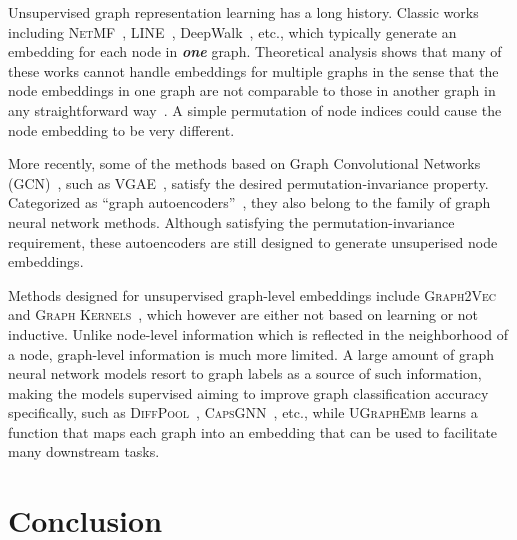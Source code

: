 \documentclass{article}
\newcommand{\model}{\textsc{UGraphEmb}\xspace}
\newcommand{\netmf}{\textsc{NetMF}\xspace}
\newcommand{\gk}{\textsc{Graph Kernels}\xspace}
\newcommand{\gv}{\textsc{Graph2Vec}\xspace}
\newcommand{\gcn}{\textsc{GCN}\xspace}
\begin{document}
Unsupervised graph representation learning has a long history. Classic works including \netmf~\cite{qiu2017network}, LINE~\cite{tang2015line}, DeepWalk~\cite{perozzi2014deepwalk}, etc., which typically generate an embedding for each node in \textbf{\textit{one}} graph. Theoretical analysis shows that many of these works cannot handle embeddings for multiple graphs in the sense that the node embeddings in one graph are not comparable to those in another graph in any straightforward way~\cite{heimann2017generalizing}. A simple permutation of node indices could cause the node embedding to be very different.

More recently, some of the methods based on Graph Convolutional Networks (\gcn)~\cite{defferrard2016convolutional,kipf2016semi}, such as \textsc{VGAE}~\cite{kipf2016variational}, satisfy the desired permutation-invariance property.
Categorized as ``graph autoencoders''~\cite{wu2019comprehensive}, they also belong to the family of graph neural network methods. Although satisfying the permutation-invariance requirement, these autoencoders are still designed to generate unsuperised node embeddings.

Methods designed for unsupervised graph-level embeddings include \gv~\cite{narayanan2017graph2vec}
and \gk~\cite{yanardag2015deep}, which however are either not based on learning or not inductive. 
Unlike node-level information which is reflected in the neighborhood of a node,
graph-level information is much more limited. A large amount of graph neural network models resort to graph labels as a source of such information, 
making the models supervised aiming to improve graph classification accuracy specifically, such as \textsc{DiffPool}~\cite{ying2018hierarchical}, \textsc{CapsGNN}~\cite{zhang2018capsule}, etc.,
while \model learns a function that maps each graph into an embedding that can be used to facilitate many downstream tasks.






















 






 \section{Conclusion}
\end{document}
